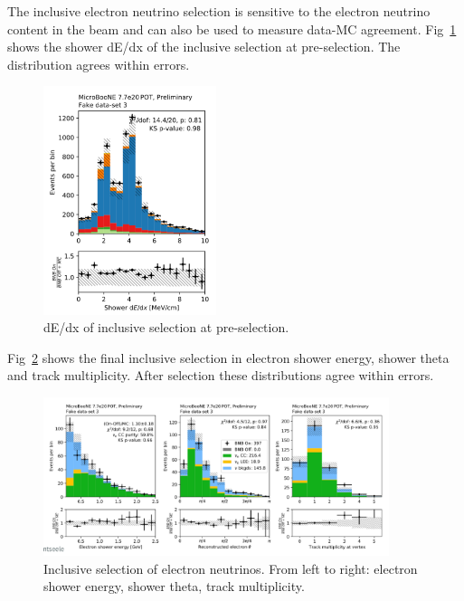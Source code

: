 The inclusive electron neutrino selection is sensitive to the electron neutrino content in the beam and can also be used to measure data-MC agreement.  Fig~\ref{fig:fakedata:set3:inc_presel} shows the shower dE/dx of the inclusive selection at pre-selection.  The distribution agrees within errors.   

\begin{figure}[H]
\begin{center}
\includegraphics[width=0.45\textwidth]{Fakedata/set3/inc_presel.pdf}
\caption{\label{fig:fakedata:set3:inc_presel} dE/dx of inclusive selection at pre-selection.}
\end{center}
\end{figure}

Fig~\ref{fig:fakedata:set3:inc_postsel} shows the final inclusive selection in electron shower energy, shower theta and track multiplicity.  After selection these distributions agree within errors.

\begin{figure}[H]
\begin{center}
\includegraphics[width=0.9\textwidth]{Fakedata/set3/incl_postsel.pdf}
\caption{\label{fig:fakedata:set3:inc_postsel} Inclusive selection of electron neutrinos. From left to right: electron shower energy, shower theta, track multiplicity.}
\end{center}
\end{figure}


